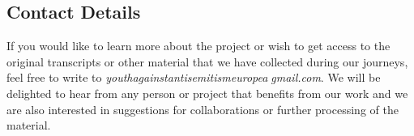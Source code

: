 \subsection*{Contact Details}
If you would like to learn more about the project or wish to get access to the original transcripts or other material that we have collected during our journeys, feel free to write to \textit{youthagainstantisemitismeurope\textcircled{a}gmail.com}. We will be delighted to hear from any person or project that benefits from our work and we are also interested in suggestions for collaborations or further processing of the material.
